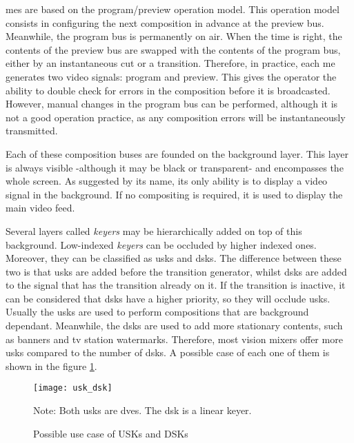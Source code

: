 \documentclass[../main.tex]{subfiles}
\begin{document}
\Glspl{me} are based on the program/preview operation model. This operation model consists in configuring the next composition in advance at the preview bus. Meanwhile, the program bus is permanently on air. When the time is right, the contents of the preview bus are swapped with the contents of the program bus, either by an instantaneous cut or a transition. Therefore, in practice, each \gls{me} generates two video signals: program and preview. This gives the operator the ability to double check for errors in the composition before it is broadcasted. However, manual changes in the program bus can be performed, although it is not a good operation practice, as any composition errors will be instantaneously transmitted.\newline

Each of these composition buses are founded on the background layer. This layer is always visible -although it may be black or transparent- and encompasses the whole screen. As suggested by its name, its only ability is to display a video signal in the background. If no compositing is required, it is used to display the main video feed.\newline

Several layers called \textit{keyers} may be hierarchically added on top of this background. Low-indexed \textit{keyers} can be occluded by higher indexed ones. Moreover, they can be classified as \glspl{usk} and \glspl{dsk}. The difference between these two is that \glspl{usk} are added before the transition generator, whilst \glspl{dsk} are added to the signal that has the transition already on it. If the transition is inactive, it can be considered that \glspl{dsk} have a higher priority, so they will occlude \glspl{usk}. Usually the \glspl{usk} are used to perform compositions that are background dependant. Meanwhile, the \glspl{dsk} are used to add more stationary contents, such as banners and \gls{tv} station watermarks. Therefore, most vision mixers offer more \glspl{usk} compared to the number of \glspl{dsk}. A possible case of each one of them is shown in the figure \ref{fig:usk_dsk_example}.

\begin{figure}[htbp]
    \centering
    \texttt{[image: usk\_dsk]}

    Note: Both \glspl{usk} are \glspl{dve}. The \gls{dsk} is a linear keyer.
    \caption{Possible use case of USKs and DSKs}
    \label{fig:usk_dsk_example}
\end{figure}
\end{document}
